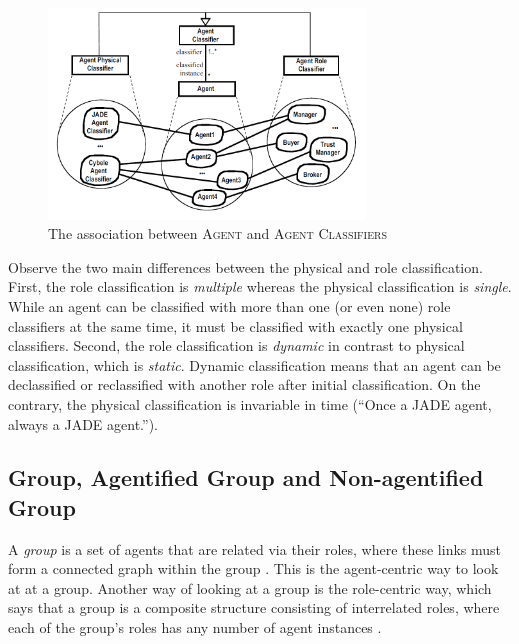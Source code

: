 \begin{figure}[h]
	\centering
	\includegraphics[width=0.75\textwidth]{images/onp-agent-agent-classifier-association.png}
	\caption{The association between \textsc{Agent} and \textsc{Agent Classifiers}}
	\label{figure:onp-agent-agent-classifier-association}
\end{figure}

Observe the two main differences between the physical and role classification. First, the role classification is \textit{multiple} whereas the physical classification is \textit{single}.
While an agent can be classified with more than one (or even none) role classifiers at the same time, it must be classified with exactly one physical classifiers.
Second, the role classification is \textit{dynamic} in contrast to physical classification, which is \textit{static}.
Dynamic classification means that an agent can be declassified or reclassified with another role after initial classification. On the contrary, the physical classification is invariable in time
(``Once a JADE agent, always a JADE agent.'').

\subsection{Group, Agentified Group and Non-agentified Group}

A \textit{group} is a set of agents that are related via their roles, where these links must form
a connected graph within the group \cite{Odell05}.
This is the agent-centric way to look at at a group.
Another way of looking at a group is the role-centric way, which says that a group is a composite structure consisting of interrelated roles, where each of the group's roles has any number of agent instances \cite{Odell05}.

